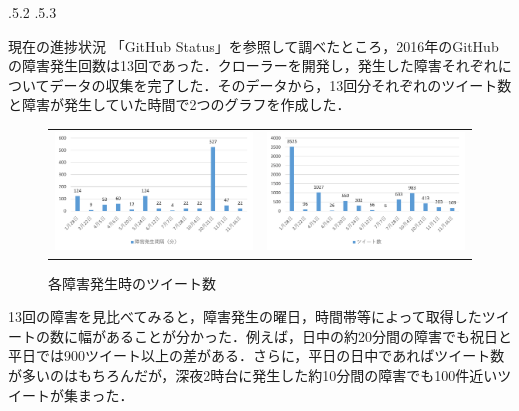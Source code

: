 \documentclass[uplatex]{jsarticle}
\makeatletter
\renewcommand{\section}{%
    \if@slide\clearpage\fi
    \@startsection{section}{1}{\z@}%
    {\Cvs \@plus.5\Cdp \@minus.2\Cdp}%
    {.5\Cvs \@plus.3\Cdp}%
    {\normalfont\raggedright}}
\makeatother
\begin{document}
\section{現在の進捗状況}
「GitHub Status」を参照して調べたところ，2016年のGitHubの障害発生回数は13回であった．クローラーを開発し，発生した障害それぞれについてデータの収集を完了した．そのデータから，13回分それぞれのツイート数と障害が発生していた時間で2つのグラフを作成した．
\begin{center}
\begin{figure}[htbp]
\begin{tabular}{cc}
\begin{minipage}[t]{0.5\hsize}
 \centering
 \includegraphics[width=8.5cm,clip]{graph1.pdf}
 \caption{各障害発生時の時間間隔}
 \label{ラベル1}
\end{minipage} &
\begin{minipage}[t]{0.5\hsize}
 \centering
 \includegraphics[width=8.5cm,clip]{graph2.pdf}
 \caption{各障害発生時のツイート数}
 \label{ラベル2}
\end{minipage}
\end{tabular}
\end{figure}
\end{center}

13回の障害を見比べてみると，障害発生の曜日，時間帯等によって取得したツイートの数に幅があることが分かった．例えば，日中の約20分間の障害でも祝日と平日では900ツイート以上の差がある．さらに，平日の日中であればツイート数が多いのはもちろんだが，深夜2時台に発生した約10分間の障害でも100件近いツイートが集まった．
\end{document}
